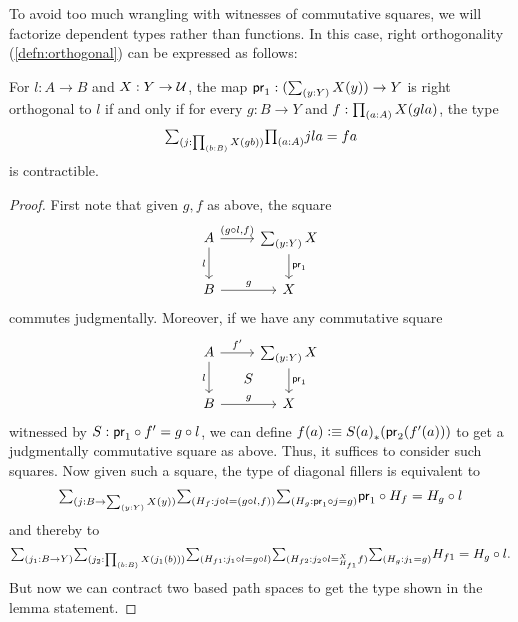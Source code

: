 To avoid too much wrangling with witnesses of commutative squares, we will factorize dependent types rather than functions.
In this case, right orthogonality (\cref{defn:orthogonal}) can be expressed as follows:

\begin{lem}\label{thm:orth-dep}
  For $l:A\to B$ and $X:Y\to\mathcal{U}$, the map $\proj1 : (\sm{y:Y}X(y)) \to Y$ is right orthogonal to $l$ if and only if for every $g:B\to Y$ and $f:\prd{a:A} X(gla)$, the type
  \begin{equation}
    \sm{j:\prd{b:B} X(gb)} \prd{a:A} jla = fa\label{eq:dep-fillers}
  \end{equation}
  is contractible.
\end{lem}
\begin{proof}
  First note that given $g,f$ as above, the square
  \[
  \begin{tikzcd}
    A \ar[d,"l"'] \ar[r,"{(g\circ l,f)}"] & \sm{y:Y}X \ar[d,"\proj1"] \\ B \ar[r,"g"] & X
  \end{tikzcd}
  \]
  commutes judgmentally.
  Moreover, if we have any commutative square
  \[
  \begin{tikzcd}
    A \ar[d,"l"'] \ar[r,"f'"] \ar[dr,phantom,"S"] & \sm{y:Y}X \ar[d,"\proj1"] \\ B \ar[r,"g"] & X
  \end{tikzcd}
  \]
  witnessed by $S:\mathsf{pr}_{1} \circ f'=g\circ l$, we can define $f(a) \vcentcolon\equiv {S(a)}_{*}\mathopen{}\left({\mathsf{pr}_{2}(f'(a))}\right)\mathclose{}$ to get a judgmentally commutative square as above.
  Thus, it suffices to consider such squares.
  Now given such a square, the type of diagonal fillers is equivalent to
  \[ \sm{j:B\to \sm{y:Y} X(y)}{H_f : j\circ l = (g\circ l,f)}{H_g : \proj1 \circ j = g} \proj1 \circ H_f = H_g \circ l \]
  and thereby to
  \[ \sm{j_1:B\to Y}{j_2 : \prd{b:B} X(j_1(b))}{H_{f1} : j_1 \circ l = g\circ l}{H_{f2} : \dpath{X}{H_{f1}}{j_2\circ l}{f}}{H_g : j_1 = g} H_{f1} = H_g \circ l. \]
  But now we can contract two based path spaces to get the type shown in the lemma statement.
\end{proof}

